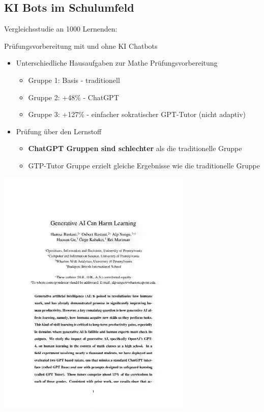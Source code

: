 \documentclass[
  letterpaper,
  DIV=11,
  numbers=noendperiod]{scrartcl}
\providecommand{\tightlist}{%
  \setlength{\itemsep}{0pt}\setlength{\parskip}{0pt}}\usepackage{longtable,booktabs,array}
\begin{document}
\subsection{KI Bots im Schulumfeld}\label{ki-bots-im-schulumfeld}

Vergleichsstudie an 1000 Lernenden:

Prüfungsvorbereitung mit und ohne KI Chatbots

\begin{itemize}
\tightlist
\item
  Unterschiedliche Hausaufgaben zur Mathe Prüfungsvorbereitung

  \begin{itemize}
  \tightlist
  \item
    Gruppe 1: Basis - traditionell
  \item
    Gruppe 2: +48\% - ChatGPT
  \item
    Gruppe 3: +127\% - einfacher sokratischer GPT-Tutor (nicht adaptiv)
  \end{itemize}
\item
  Prüfung über den Lernstoff

  \begin{itemize}
  \tightlist
  \item
    \textbf{ChatGPT Gruppen sind schlechter} als die traditionelle
    Gruppe
  \item
    GTP-Tutor Gruppe erzielt gleiche Ergebnisse wie die traditionelle
    Gruppe
  \end{itemize}
\end{itemize}

\includegraphics[width=0.7\textwidth,height=\textheight]{images/AI harm learning.webp}
\end{document}
